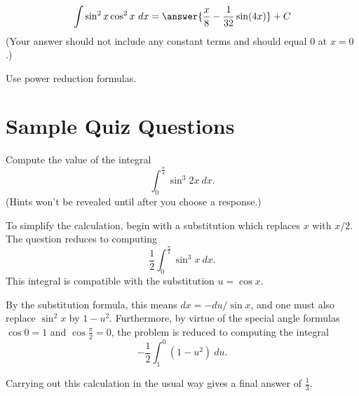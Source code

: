 \documentclass{ximera}
\begin{document}
\begin{exercise}%
\[ \int \sin^2 x\cos^2 x\ dx = \answer{\frac{x}{8}-\frac{1}{32} \sin (4 x)}+ C \]
(Your answer should not include any constant terms and should equal $0$ at $x = 0$.)
\begin{hint}
Use power reduction formulas.
\end{hint}
%
%
\end{exercise}


\section*{Sample Quiz Questions}

\begin{question}%

Compute the value of the integral
\[\int_{0}^{\frac{\pi}{4}} \sin^{3} 2x ~dx.\]
(Hints won't be revealed until after you choose a response.)
\begin{multiplechoice}
\end{multiplechoice}
\begin{feedback}
To simplify the calculation, begin with a substitution which replaces \(x\) with \(x/2\). The question reduces to computing
\[\frac{1}{2}\int_{0}^{\frac{\pi}{2}} \sin^{3} x ~dx.\]
This integral is compatible with the substitution \(u = \cos x\). \begin{hint} By the substitution formula, this means \(dx = - du / \sin x\), and one must also replace \(\sin^2 x\) by \(1 - u^2\). Furthermore, by virtue of the special angle formulas \(\cos 0 = 1\) and \(\cos \frac{\pi}{2} = 0\), the problem is reduced to computing the integral
\[-\frac{1}{2}\int_{1}^{0} (1 - u^2) ~du.\]
\begin{hint}
Carrying out this calculation in the usual way gives a final answer of \(\frac{1}{3}\).
\end{hint}
\end{hint}
\end{feedback}

\end{question}
\end{document}
